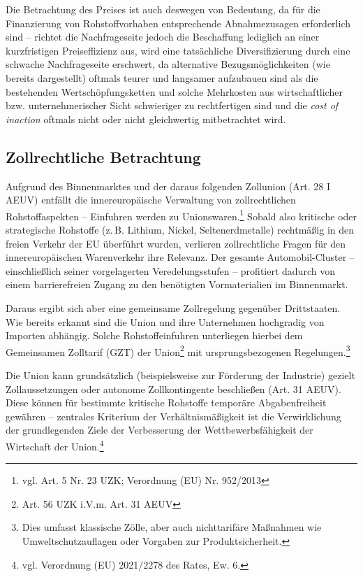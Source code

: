 \documentclass[12pt,a4paper,oneside]{book} %
\begin{document}
Die Betrachtung des Preises ist auch deswegen von Bedeutung, da für die Finanzierung von Rohstoffvorhaben entsprechende Abnahmezusagen erforderlich sind -- richtet die Nachfrageseite jedoch die Beschaffung lediglich an einer kurzfristigen Preiseffizienz aus, wird eine tatsächliche Diversifizierung durch eine schwache Nachfrageseite erschwert, da alternative Bezugsmöglichkeiten (wie bereits dargestellt) oftmals teurer und langsamer aufzubauen sind als die bestehenden Wertschöpfungsketten und solche Mehrkosten aus wirtschaftlicher bzw. unternehmerischer Sicht schwieriger zu rechtfertigen sind und die \textit{cost of inaction} oftmals nicht oder nicht gleichwertig mitbetrachtet wird.\autocite{KAS: Vom Dialog zur Lieferkette: S. 36}


\subsection{Zollrechtliche Betrachtung}
Aufgrund des Binnenmarktes und der daraus folgenden Zollunion (Art. 28 I AEUV) entfällt die innereuropäische Verwaltung von zollrechtlichen Rohstoffaspekten -- Einfuhren werden zu \glqq Unionswaren\grqq.\footnote{vgl. Art. 5 Nr. 23 UZK; Verordnung (EU) Nr. 952/2013} Sobald also kritische oder strategische Rohstoffe (z. B. Lithium, Nickel, Seltenerdmetalle) rechtmäßig in den freien Verkehr der EU überführt wurden, verlieren zollrechtliche Fragen für den innereuropäischen Warenverkehr ihre Relevanz. Der gesamte Automobil-Cluster – einschließlich seiner vorgelagerten Veredelungsstufen – profitiert dadurch von einem barrierefreien Zugang zu den benötigten Vormaterialien im Binnenmarkt.

Daraus ergibt sich aber eine gemeinsame Zollregelung gegenüber Drittstaaten. Wie bereits erkannt sind die Union und ihre Unternehmen hochgradig von Importen abhängig. Solche Rohstoffeinfuhren unterliegen hierbei dem Gemeinsamen Zolltarif (GZT) der Union\footnote{Art. 56 UZK i.V.m. Art. 31 AEUV} mit ursprungsbezogenen Regelungen.\footnote{Dies umfasst klassische Zölle, aber auch nichttarifäre Maßnahmen wie Umweltschutzauflagen oder Vorgaben zur Produktsicherheit.}

Die Union kann grundsätzlich (beispielsweise zur Förderung der Industrie) gezielt Zollaussetzungen oder autonome Zollkontingente beschließen (Art. 31 AEUV). Diese können für bestimmte kritische Rohstoffe temporäre Abgabenfreiheit gewähren -- zentrales Kriterium der Verhältnismäßigkeit ist die Verwirklichung der grundlegenden Ziele der Verbesserung der Wettbewerbsfähigkeit der Wirtschaft der Union.\footnote{vgl. Verordnung (EU) 2021/2278 des Rates, Ew. 6.}
\end{document}
